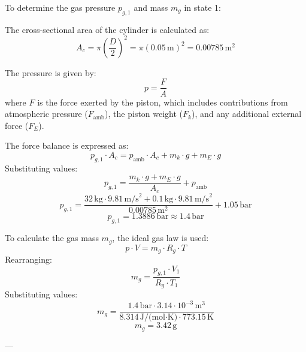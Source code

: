 To determine the gas pressure \( p_{g,1} \) and mass \( m_g \) in state 1:  

The cross-sectional area of the cylinder is calculated as:  
\[
A_c = \pi \left( \frac{D}{2} \right)^2 = \pi \left( 0.05 \, \text{m} \right)^2 = 0.00785 \, \text{m}^2
\]  

The pressure is given by:  
\[
p = \frac{F}{A}
\]  
where \( F \) is the force exerted by the piston, which includes contributions from atmospheric pressure (\( F_{\text{amb}} \)), the piston weight (\( F_k \)), and any additional external force (\( F_E \)).  

The force balance is expressed as:  
\[
p_{g,1} \cdot A_c = p_{\text{amb}} \cdot A_c + m_k \cdot g + m_E \cdot g
\]  
Substituting values:  
\[
p_{g,1} = \frac{m_k \cdot g + m_E \cdot g}{A_c} + p_{\text{amb}}
\]  
\[
p_{g,1} = \frac{32 \, \text{kg} \cdot 9.81 \, \text{m/s}^2 + 0.1 \, \text{kg} \cdot 9.81 \, \text{m/s}^2}{0.00785 \, \text{m}^2} + 1.05 \, \text{bar}
\]  
\[
p_{g,1} = 1.3886 \, \text{bar} \approx 1.4 \, \text{bar}
\]  

To calculate the gas mass \( m_g \), the ideal gas law is used:  
\[
p \cdot V = m_g \cdot R_g \cdot T
\]  
Rearranging:  
\[
m_g = \frac{p_{g,1} \cdot V_1}{R_g \cdot T_1}
\]  
Substituting values:  
\[
m_g = \frac{1.4 \, \text{bar} \cdot 3.14 \cdot 10^{-3} \, \text{m}^3}{8.314 \, \text{J/(mol·K)} \cdot 773.15 \, \text{K}}
\]  
\[
m_g = 3.42 \, \text{g}
\]  

---